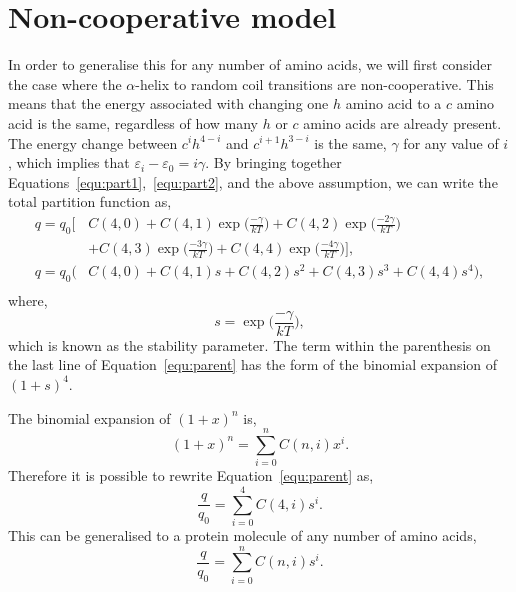 \documentclass[a4paper]{article}
\begin{document}
\section{Non-cooperative model}
In order to generalise this for any number of amino acids, we will first consider the case where the $\alpha$-helix to random coil transitions are non-cooperative. 
This means that the energy associated with changing one $h$ amino acid to a $c$ amino acid is the same, regardless of how many $h$ or $c$ amino acids are already present. 
The energy change between $c^ih^{4-i}$ and $c^{i+1}h^{3-i}$ is the same, $\gamma$ for any value of $i$, which implies that $\varepsilon_i - \varepsilon_0 = i\gamma$.
By bringing together Equations~\ref{equ:part1},~\ref{equ:part2}, and the above assumption, we can write the total partition function as,
%
\begin{equation}
    \begin{aligned}
        q = q_0\Bigg[&C(4, 0) + C(4, 1) \exp{\bigg(\frac{-\gamma}{kT}\bigg)} + C(4, 2) \exp{\bigg(\frac{-2\gamma}{kT}\bigg)} \\
         & + C(4, 3) \exp{\bigg(\frac{-3\gamma}{kT}\bigg)} + C(4, 4) \exp{\bigg(\frac{-4\gamma}{kT}\bigg)}\Bigg], \\
        q = q_0(&C(4, 0) + C(4, 1) s + C(4, 2) s^2 + C(4, 3) s^3 + C(4, 4) s^4), \\
    \end{aligned}
    \label{equ:parent}
\end{equation}
%
where, 
%
\begin{equation}
    s = \exp{\bigg(\frac{-\gamma}{kT}\bigg)},
\end{equation}
%
which is known as the stability parameter. 
The term within the parenthesis on the last line of Equation~\ref{equ:parent} has the form of the binomial expansion of $(1 + s)^4$. 

The binomial expansion of $(1 + x)^n$ is, 
%
\begin{equation}
    (1 + x)^n = \sum_{i=0}^{n}C(n, i)x^i.
\end{equation}
%
Therefore it is possible to rewrite Equation~\ref{equ:parent} as, 
%
\begin{equation}
    \frac{q}{q_0} = \sum_{i=0}^{4}C(4, i)s^i.
\end{equation}
%
This can be generalised to a protein molecule of any number of amino acids, 
%
\begin{equation}
    \frac{q}{q_0} = \sum_{i=0}^{n}C(n, i)s^i.
\end{equation}
%
\end{document}
